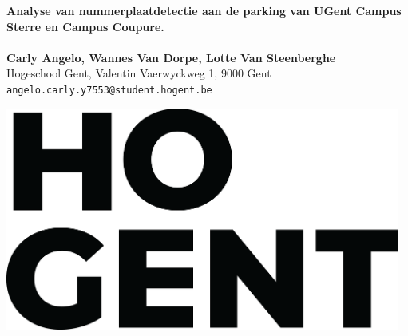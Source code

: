 \documentclass[a0,portrait]{a0poster}
\begin{document}


\begin{minipage}[t]{0.75\linewidth}
\VeryHuge \color{HoGentAccent1} \textbf{Analyse van nummerplaatdetectie aan de parking van UGent Campus Sterre en Campus Coupure.} \color{Black}\\ %
\Huge\textit{}\\[2.4cm] %
\huge \textbf{Carly Angelo, Wannes Van Dorpe, Lotte Van Steenberghe}\\[0.5cm] %
\huge Hogeschool Gent, Valentin Vaerwyckweg 1, 9000 Gent\\[0.4cm] %
\Large \texttt{angelo.carly.y7553@student.hogent.be} \\
\end{minipage}
%
\begin{minipage}[t]{0.25\linewidth}
\includegraphics[width=13cm,right]{figures/HOGENT_Logo_Pos_rgb.png} 

\end{minipage}

\vspace{1cm} %

\end{document}
